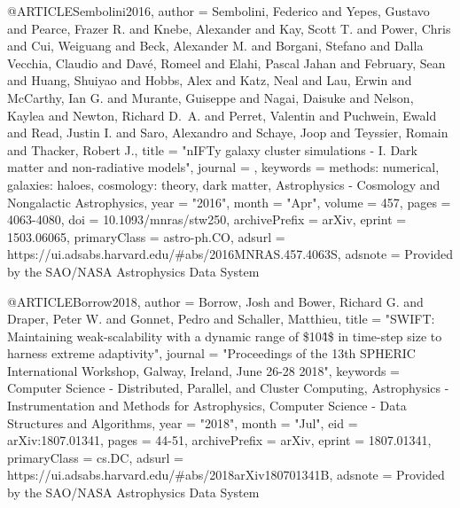 @ARTICLE{Sembolini2016,
       author = {{Sembolini}, Federico and {Yepes}, Gustavo and {Pearce}, Frazer R. and
         {Knebe}, Alexander and {Kay}, Scott T. and {Power}, Chris and
         {Cui}, Weiguang and {Beck}, Alexander M. and {Borgani}, Stefano and
         {Dalla Vecchia}, Claudio and {Dav{\'e}}, Romeel and
         {Elahi}, Pascal Jahan and {February}, Sean and {Huang}, Shuiyao and
         {Hobbs}, Alex and {Katz}, Neal and {Lau}, Erwin and {McCarthy}, Ian G. and
         {Murante}, Guiseppe and {Nagai}, Daisuke and {Nelson}, Kaylea and
         {Newton}, Richard D.~A. and {Perret}, Valentin and {Puchwein}, Ewald and
         {Read}, Justin I. and {Saro}, Alexandro and {Schaye}, Joop and
         {Teyssier}, Romain and {Thacker}, Robert J.},
        title = "{nIFTy galaxy cluster simulations - I. Dark matter and non-radiative models}",
      journal = {\mnras},
     keywords = {methods: numerical, galaxies: haloes, cosmology: theory, dark matter, Astrophysics - Cosmology and Nongalactic Astrophysics},
         year = "2016",
        month = "Apr",
       volume = {457},
        pages = {4063-4080},
          doi = {10.1093/mnras/stw250},
archivePrefix = {arXiv},
       eprint = {1503.06065},
 primaryClass = {astro-ph.CO},
       adsurl = {https://ui.adsabs.harvard.edu/\#abs/2016MNRAS.457.4063S},
      adsnote = {Provided by the SAO/NASA Astrophysics Data System}
}

@ARTICLE{Borrow2018,
       author = {{Borrow}, Josh and {Bower}, Richard G. and {Draper}, Peter W. and
         {Gonnet}, Pedro and {Schaller}, Matthieu},
        title = "{SWIFT: Maintaining weak-scalability with a dynamic range of \$10\^4\$ in time-step size to harness extreme adaptivity}",
      journal = "{Proceedings of the 13th SPHERIC International Workshop, Galway, Ireland, June 26-28 2018}",
     keywords = {Computer Science - Distributed, Parallel, and Cluster Computing, Astrophysics - Instrumentation and Methods for Astrophysics, Computer Science - Data Structures and Algorithms},
         year = "2018",
        month = "Jul",
          eid = {arXiv:1807.01341},
        pages = {44-51},
archivePrefix = {arXiv},
       eprint = {1807.01341},
 primaryClass = {cs.DC},
       adsurl = {https://ui.adsabs.harvard.edu/\#abs/2018arXiv180701341B},
      adsnote = {Provided by the SAO/NASA Astrophysics Data System}
}

